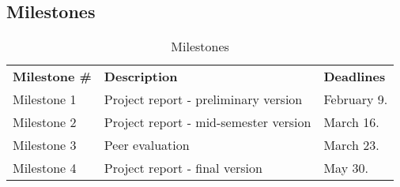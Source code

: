 \subsection{Milestones}
\begin{table}[H]
\centering
{}
\begin{tabular}{|l|l|l|}
\hline
\textbf{Milestone \#} & \textbf{Description} & \textbf{Deadlines}\\
Milestone 1& Project report - preliminary version & February 9. \\
Milestone 2 & Project report - mid-semester version & March 16.  \\
Milestone 3 & Peer evaluation & March 23.  \\
 Milestone 4 & Project report - final version & May 30.\\\hline
\end{tabular}
\caption{Milestones}
\end{table}

